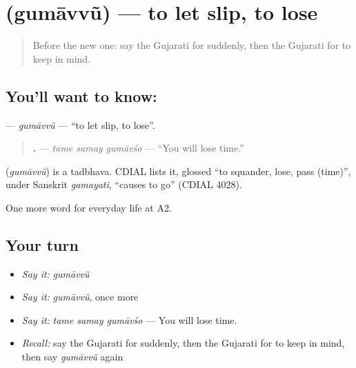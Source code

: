 \section[\texorpdfstring{\gu{ગુમાવવું} (gumāvvũ)}{ગુમાવવું (gumāvvũ)}]{ (gumāvvũ) — to let slip, to lose}

\label{lesson:GU-C182-gumavvu}



\begin{quote}
Before the new one: say the Gujarati for suddenly, then the Gujarati for to keep in mind.
\end{quote}

\subsection*{You'll want to know: }
\textbf{} — \emph{gumāvvũ} — \textquotedblleft{}to let slip, to lose\textquotedblright{}.

\begin{quote}
\textbf{  .} — \emph{tame samay gumāvśo} — \textquotedblleft{}You will lose time.\textquotedblright{}
\end{quote}

\begin{cousinweb}
\textbf{} (\emph{gumāvvũ}) is a tadbhava. CDIAL lists it, glossed \textquotedblleft{}to squander, lose, pass (time)\textquotedblright{}, under Sanskrit \emph{gamayati}, \textquotedblleft{}causes to go\textquotedblright{} (CDIAL 4028).
\end{cousinweb}

\begin{grammarlens}[title={What you've built}]
One more word for everyday life at A2.
\end{grammarlens}

\subsection*{Your turn}
\begin{itemize}
\raggedright
  \item \emph{Say it:} \emph{gumāvvũ}
  \item \emph{Say it:} \emph{gumāvvũ}, once more
  \item \emph{Say it:} \emph{tame samay gumāvśo} — You will lose time.
  \item \emph{Recall:} say the Gujarati for suddenly, then the Gujarati for to keep in mind, then say \emph{gumāvvũ} again
\end{itemize}

